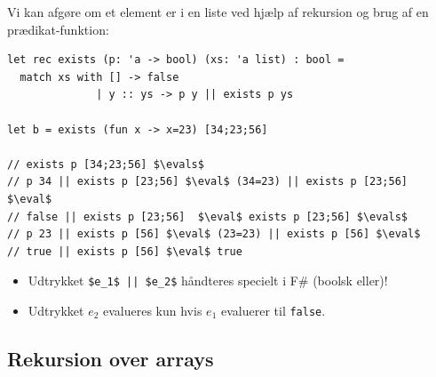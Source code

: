 \documentclass[rgb]{beamer}
\begin{document}
\begin{frame}[fragile]
\begin{footnotesize}


  \vspace{1ex}
  Vi kan afgøre om et element er i en liste ved hjælp af rekursion og brug af en prædikat-funktion:
\begin{lstlisting}[numbers=none,frame=none,mathescape]
let rec exists (p: 'a -> bool) (xs: 'a list) : bool =
  match xs with [] -> false
              | y :: ys -> p y || exists p ys

let b = exists (fun x -> x=23) [34;23;56]

// exists p [34;23;56] $\evals$
// p 34 || exists p [23;56] $\eval$ (34=23) || exists p [23;56] $\eval$
// false || exists p [23;56]  $\eval$ exists p [23;56] $\evals$
// p 23 || exists p [56] $\eval$ (23=23) || exists p [56] $\eval$
// true || exists p [56] $\eval$ true
\end{lstlisting}


\begin{itemize}
\item Udtrykket \lstinline[mathescape]{$e_1$ || $e_2$} håndteres specielt i
  F\# (boolsk eller)!
\item Udtrykket $e_2$ evalueres kun hvis $e_1$ evaluerer til
\lstinline{false}.
\end{itemize}
\end{footnotesize}
\end{frame}

\subsection{Rekursion over arrays}
\end{document}
